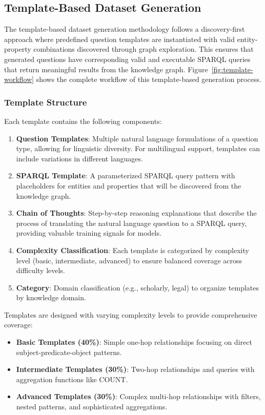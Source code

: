 \subsection{Template-Based Dataset Generation}
The template-based dataset generation methodology follows a discovery-first approach where predefined question templates are instantiated with valid entity-property combinations discovered through graph exploration. This ensures that generated questions have corresponding valid and executable SPARQL queries that return meaningful results from the knowledge graph. Figure~\ref{fig:template-workflow} shows the complete workflow of this template-based generation process.

\subsubsection{Template Structure}
Each template contains the following components:

\begin{enumerate}
    \item \textbf{Question Templates}: Multiple natural language formulations of a question type, allowing for linguistic diversity. For multilingual support, templates can include variations in different languages.
    
    \item \textbf{SPARQL Template}: A parameterized SPARQL query pattern with placeholders for entities and properties that will be discovered from the knowledge graph.
    
    \item \textbf{Chain of Thoughts}: Step-by-step reasoning explanations that describe the process of translating the natural language question to a SPARQL query, providing valuable training signals for models.
    
    \item \textbf{Complexity Classification}: Each template is categorized by complexity level (basic, intermediate, advanced) to ensure balanced coverage across difficulty levels.
    
    \item \textbf{Category}: Domain classification (e.g., scholarly, legal) to organize templates by knowledge domain.
\end{enumerate}

Templates are designed with varying complexity levels to provide comprehensive coverage:

\begin{itemize}
    \item \textbf{Basic Templates (40\%)}: Simple one-hop relationships focusing on direct subject-predicate-object patterns.
    \item \textbf{Intermediate Templates (30\%)}: Two-hop relationships and queries with aggregation functions like COUNT.
    \item \textbf{Advanced Templates (30\%)}: Complex multi-hop relationships with filters, nested patterns, and sophisticated aggregations.
\end{itemize}

